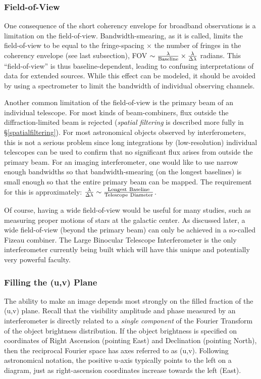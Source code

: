 \documentclass[12pt]{article}
\begin{document}
\subsubsection{Field-of-View}
One consequence of the short coherency envelope for broadband
observations is a limitation on the field-of-view. Bandwidth-smearing,
as it is called, limits the field-of-view to be equal to the
fringe-spacing $\times$ the number of fringes in the coherency
envelope (see last subsection), FOV $ \sim \frac{\lambda}{\rm
  Baseline} \times \frac{\lambda}{\Delta \lambda}$ radians.  This
``field-of-view'' is thus baseline-dependent, leading to confusing
interpretations of data for extended sources. While this effect can be
modeled, it should be avoided by using a spectrometer to limit the
bandwidth of individual observing channels.

Another common limitation of the field-of-view is the primary beam of
an individual telescope.  For most kinds of beam-combiners, flux
outside the diffraction-limited beam is rejected ({\em spatial
  filtering} is described more fully in \S\ref{spatialfiltering}).
For most astronomical objects observed by interferometers, this is not
a serious problem since long integrations by (low-resolution)
individual telescopes can be used to confirm that no significant flux
arises from outside the primary beam.  For an imaging interferometer,
one would like to use narrow enough bandwidths so that
bandwidth-smearing (on the longest baselines) is small enough so that
the entire primary beam can be mapped. The requirement for this is
approximately: $\frac{\lambda}{\Delta \lambda} \sim \frac{\rm
  Longest~Baseline}{\rm Telescope~Diameter}$.

Of course, having a wide field-of-view would be useful for many
studies, such as measuring proper motions of stars at the galactic
center.  As discussed later, a wide field-of-view (beyond the primary
beam) can only be achieved in a so-called Fizeau combiner.  The Large
Binocular Telescope Interferometer is the only interferometer
currently being built which will have this unique and potentially very
powerful faculty.

\subsubsection{Filling the (u,v) Plane}
\label{uvplane}

The ability to make an image depends most strongly on the 
filled fraction of the  (u,v) plane.  Recall
that the visibility amplitude and phase measured by an interferometer
is directly related to a {\em single component} of the Fourier Transform of the
object brightness distribution.  If the object brightness is 
specified on coordinates of Right Ascension (pointing East) and
Declination (pointing North), then the reciprocal Fourier space
has axes referred to as (u,v).  Following astronomical notation, the positive u-axis
typically points to the left on a diagram, just as right-ascension coordinates 
increase towards the left (East).  
\end{document}
